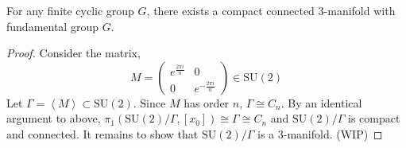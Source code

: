 \documentclass[12pt]{extarticle}
\newcommand{\SU}[1]{\mathrm{SU}(#1)}
\begin{document}
\begin{theorem}
For any finite cyclic group $G$, there exists a compact connected 3-manifold with fundamental group $G$.  
\end{theorem}

\begin{proof}
Consider the matrix,
\[
M = \begin{pmatrix}
e^{\frac{2 \pi i}{n}} & 0 \\
0 & e^{-\frac{2 \pi i}{n}}
\end{pmatrix} \in \SU{2}\]
Let $\Gamma = \left< M \right> \subset \SU{2}$. Since $M$ has order $n$, $\Gamma \cong C_n$. By an identical argument to above, $\pi_1(\SU{2}/\Gamma, [x_0]) \cong \Gamma \cong C_n$ and $\SU{2}/\Gamma$ is compact and connected. It remains to show that $\SU{2}/\Gamma$ is a 3-manifold. (WIP)
\end{proof}
\end{document}
